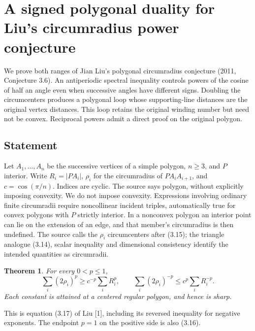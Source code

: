 \documentclass[11pt,a4paper]{article}
\numberwithin{equation}{section}
\newtheorem{theorem}{Theorem}[section]
\theoremstyle{definition}
\theoremstyle{remark}
\newenvironment{sectionabstract}{\par\smallskip\begingroup\small\noindent}{\par\endgroup\medskip}
\begin{document}
\section{\texorpdfstring{A signed polygonal duality for Liu's circumradius power conjecture}{A signed polygonal duality for Liu's circumradius power conjecture}}\label{section:r42showa}
\par\medskip


\begin{sectionabstract}
We prove both ranges of Jian Liu's polygonal circumradius conjecture (2011, Conjecture 3.6). An antiperiodic spectral inequality controls powers of the cosine of half an angle even when successive angles have different signs. Doubling the circumcenters produces a polygonal loop whose supporting-line distances are the original vertex distances. This loop retains the original winding number but need not be convex. Reciprocal powers admit a direct proof on the original polygon.
\end{sectionabstract}
\subsection{Statement}
Let $A_1,\ldots,A_n$ be the successive vertices of a simple polygon, $n\ge3$, and $P$ interior. Write $R_i=|PA_i|$, $\rho_i$ for the circumradius of $PA_iA_{i+1}$, and $c=\cos(\pi/n)$. Indices are cyclic. The source says polygon, without explicitly imposing convexity. We do not impose convexity. Expressions involving ordinary finite circumradii require noncollinear incident triples, automatically true for convex polygons with $P$ strictly interior. In a nonconvex polygon an interior point can lie on the extension of an edge, and that member's circumradius is then undefined. The source calls the $\rho_i$ circumcenters after (3.15); the triangle analogue (3.14), scalar inequality and dimensional consistency identify the intended quantities as circumradii.
\begin{theorem}
For every $0<p\le1$,
\[
 \sum_i(2\rho_i)^p\ge c^{-p}\sum_i R_i^p,
 \qquad
 \sum_i(2\rho_i)^{-p}\le c^p\sum_i R_i^{-p}.
\]
Each constant is attained at a centered regular polygon, and hence is sharp.
\end{theorem}
This is equation (3.17) of Liu [1], including its reversed inequality for negative exponents. The endpoint $p=1$ on the positive side is also (3.16).
\end{document}

